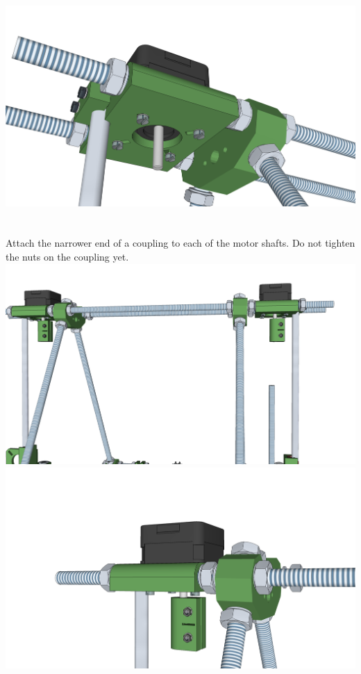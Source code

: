 \documentclass[twoside,openany,a4paper,titlepage]{memoir}
\begin{document}
	\includegraphics[width=1\linewidth]{graphics/ch8_19_4.png}
	
	\section{}
	Attach the narrower end of a coupling to each of the motor shafts. Do not tighten the nuts on the
	coupling yet.\\
	\includegraphics[width=1\linewidth]{graphics/ch8_20_1.png}
	\includegraphics[width=1\linewidth]{graphics/ch8_20_2.png}
	
\end{document}

